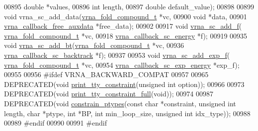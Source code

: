 \begin{DoxyCode}
00895                         \textcolor{keywordtype}{double} *values,
00896                         \textcolor{keywordtype}{int} length,
00897                         \textcolor{keywordtype}{double} default\_value);
00898 
00899 \textcolor{keywordtype}{void} vrna\_sc\_add\_data(\hyperlink{group__fold__compound_structvrna__fc__s}{vrna\_fold\_compound\_t} *vc,
00900                       \textcolor{keywordtype}{void} *data,
00901                       \hyperlink{group__fold__compound_ga3ae51bfd5fc3236652d1de4e3274b49b}{vrna\_callback\_free\_auxdata} *free\_data);
00902 
00917 \textcolor{keywordtype}{void} \hyperlink{group__generalized__sc_ga8c7d907ec0125cd61c04e0908010a4e9}{vrna\_sc\_add\_f}( \hyperlink{group__fold__compound_structvrna__fc__s}{vrna\_fold\_compound\_t} *vc,
00918                     \hyperlink{group__generalized__sc_gaf38062858ac25fd5e240c2c3b0b0b780}{vrna\_callback\_sc\_energy} *f);
00919 
00935 \textcolor{keywordtype}{void} \hyperlink{group__generalized__sc_gabde7d07a79bb9a8f4721aee247b674ea}{vrna\_sc\_add\_bt}(\hyperlink{group__fold__compound_structvrna__fc__s}{vrna\_fold\_compound\_t} *vc,
00936                     \hyperlink{group__generalized__sc_gaa216f513c3b0bd6fe5807dd0c53a8e5a}{vrna\_callback\_sc\_backtrack} *f);
00937 
00953 \textcolor{keywordtype}{void} \hyperlink{group__generalized__sc_ga87e382b5d0c9b7d9ce1b79c0473ff700}{vrna\_sc\_add\_exp\_f}( \hyperlink{group__fold__compound_structvrna__fc__s}{vrna\_fold\_compound\_t} *vc,
00954                         \hyperlink{group__generalized__sc_ga2eade8745c163a553763be4cfe2a679b}{vrna\_callback\_sc\_exp\_energy} *exp\_f);
00955 
00956 \textcolor{preprocessor}{#ifdef  VRNA\_BACKWARD\_COMPAT}
00957 
00965 DEPRECATED(\textcolor{keywordtype}{void} \hyperlink{constraints_8h_a4d167deb70bb51723e44374dc981deb2}{print\_tty\_constraint}(\textcolor{keywordtype}{unsigned} \textcolor{keywordtype}{int} option));
00966 
00973 DEPRECATED(\textcolor{keywordtype}{void} \hyperlink{constraints_8h_ae8ae8a34962b9959be3f6c40f0a80ac1}{print\_tty\_constraint\_full}(\textcolor{keywordtype}{void}));
00974 
00987 DEPRECATED(\textcolor{keywordtype}{void} \hyperlink{constraints_8h_a36c3a6c3218b041f992052767bc74549}{constrain\_ptypes}(\textcolor{keyword}{const} \textcolor{keywordtype}{char} *constraint, \textcolor{keywordtype}{unsigned} \textcolor{keywordtype}{int} length, \textcolor{keywordtype}{char} *ptype, \textcolor{keywordtype}{
      int} *BP, \textcolor{keywordtype}{int} min\_loop\_size, \textcolor{keywordtype}{unsigned} \textcolor{keywordtype}{int} idx\_type));
00988 
00989 \textcolor{preprocessor}{#endif}
00990 
00991 \textcolor{preprocessor}{#endif}
\end{DoxyCode}
